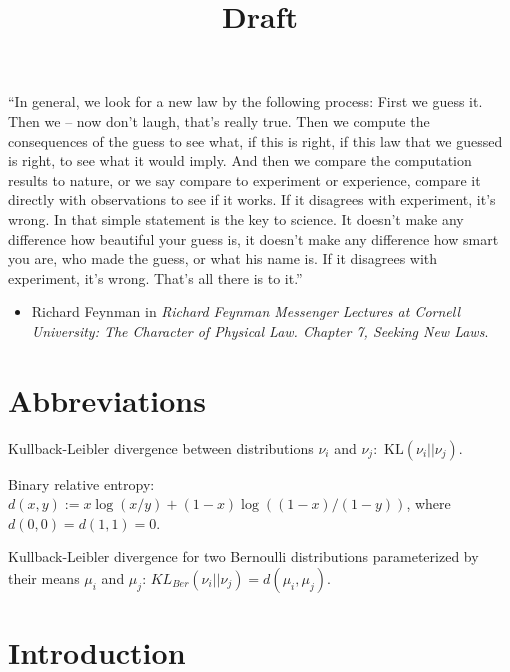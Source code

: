 \documentclass[11pt,]{article}
\title{Draft}
\author{}
\date{}
\providecommand{\tightlist}{%
  \setlength{\itemsep}{0pt}\setlength{\parskip}{0pt}}
\newcommand{\KL}{\,\text{KL}}
\begin{document}
\maketitle

{
\hypersetup{linkcolor=black}
\setcounter{tocdepth}{2}
\tableofcontents
}
\newpage

``In general, we look for a new law by the following process: First we
guess it. Then we -- now don't laugh, that's really true. Then we
compute the consequences of the guess to see what, if this is right, if
this law that we guessed is right, to see what it would imply. And then
we compare the computation results to nature, or we say compare to
experiment or experience, compare it directly with observations to see
if it works. If it disagrees with experiment, it's wrong. In that simple
statement is the key to science. It doesn't make any difference how
beautiful your guess is, it doesn't make any difference how smart you
are, who made the guess, or what his name is. If it disagrees with
experiment, it's wrong. That's all there is to it.''

\begin{itemize}
\tightlist
\item
  Richard Feynman in \emph{Richard Feynman Messenger Lectures at Cornell
  University: The Character of Physical Law. Chapter 7, Seeking New
  Laws}.
\end{itemize}

\newpage

\section{Abbreviations}\label{abbreviations}

Kullback-Leibler divergence between distributions \(\nu_i\) and
\(\nu_j\): \(\KL(\nu_i||\nu_j)\).

Binary relative entropy:
\(d(x,y) := x \log(x/y) + (1-x) \log((1-x)/(1-y))\), where
\(d(0,0) = d(1,1) = 0\).

Kullback-Leibler divergence for two Bernoulli distributions
parameterized by their means \(\mu_i\) and \(\mu_j\):
\(KL_{Ber}(\nu_i||\nu_j) = d(\mu_i, \mu_j)\).

\newpage

\section{\texorpdfstring{Introduction
\label{chap:Introduction}}{Introduction }}\label{introduction}
\end{document}

